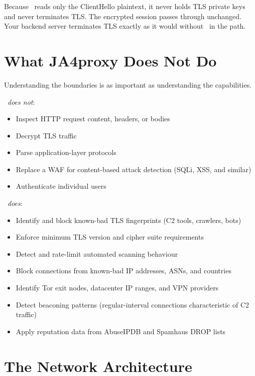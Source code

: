 \begin{notebox}
Because \ja\ reads only the ClientHello plaintext, it never holds TLS private keys
and never terminates TLS. The encrypted session passes through unchanged. Your backend
server terminates TLS exactly as it would without \ja\ in the path.
\end{notebox}

\section{What JA4proxy Does Not Do}

Understanding the boundaries is as important as understanding the capabilities.

\ja\ \emph{does not}:
\begin{itemize}
  \item Inspect HTTP request content, headers, or bodies
  \item Decrypt TLS traffic
  \item Parse application-layer protocols
  \item Replace a WAF for content-based attack detection (SQLi, XSS, and similar)
  \item Authenticate individual users
\end{itemize}

\ja\ \emph{does}:
\begin{itemize}
  \item Identify and block known-bad TLS fingerprints (C2 tools, crawlers, bots)
  \item Enforce minimum TLS version and cipher suite requirements
  \item Detect and rate-limit automated scanning behaviour
  \item Block connections from known-bad IP addresses, ASNs, and countries
  \item Identify Tor exit nodes, datacenter IP ranges, and VPN providers
  \item Detect beaconing patterns (regular-interval connections characteristic of C2 traffic)
  \item Apply reputation data from AbuseIPDB and Spamhaus DROP lists
\end{itemize}

\section{The Network Architecture}

